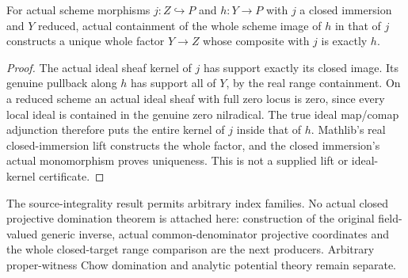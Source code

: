 \begin{lemma}
\label{scheme:actual-reduced-closed-factorization}
\leanok
For actual scheme morphisms $j:Z\hookrightarrow P$ and $h:Y\to P$ with
$j$ a closed immersion and $Y$ reduced, actual containment of the whole
scheme image of $h$ in that of $j$ constructs a unique whole factor
$Y\to Z$ whose composite with $j$ is exactly $h$.
\end{lemma}
\begin{proof}
The actual ideal sheaf kernel of $j$ has support exactly its closed image.
Its genuine pullback along $h$ has support all of $Y$, by the real range
containment. On a reduced scheme an actual ideal sheaf with full zero
locus is zero, since every local ideal is contained in the genuine zero
nilradical. The true ideal map/comap adjunction therefore puts the entire
kernel of $j$ inside that of $h$. Mathlib's real closed-immersion lift
constructs the whole factor, and the closed immersion's actual monomorphism
proves uniqueness. This is not a supplied lift or ideal-kernel certificate.
\end{proof}


The source-integrality result permits arbitrary index families. No actual closed
projective domination theorem is attached here: construction of the original
field-valued generic inverse, actual common-denominator projective coordinates
and the whole closed-target range comparison are the next producers. Arbitrary
proper-witness Chow domination and analytic potential theory remain separate.
